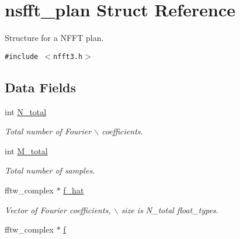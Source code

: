 \hypertarget{structnsfft__plan}{
\section{nsfft\_\-plan Struct Reference}
\label{structnsfft__plan}
}
Structure for a NFFT plan.  


{\tt \#include $<$nfft3.h$>$}

\subsection*{Data Fields}
\begin{CompactItemize}
\item 
\hypertarget{structnsfft__plan_87e0123a3ccf6a42102e065dca2f8505}{
int \hyperlink{structnsfft__plan_87e0123a3ccf6a42102e065dca2f8505}{N\_\-total}}
\label{structnsfft__plan_87e0123a3ccf6a42102e065dca2f8505}

\begin{CompactList}\small\item\em Total number of Fourier $\backslash$ coefficients. \item\end{CompactList}\item 
\hypertarget{structnsfft__plan_03da0fc6abab6b0d2e15053ef1f3109e}{
int \hyperlink{structnsfft__plan_03da0fc6abab6b0d2e15053ef1f3109e}{M\_\-total}}
\label{structnsfft__plan_03da0fc6abab6b0d2e15053ef1f3109e}

\begin{CompactList}\small\item\em Total number of samples. \item\end{CompactList}\item 
\hypertarget{structnsfft__plan_e3e2fcefd21caff3aa1e978b522d4ee3}{
fftw\_\-complex $\ast$ \hyperlink{structnsfft__plan_e3e2fcefd21caff3aa1e978b522d4ee3}{f\_\-hat}}
\label{structnsfft__plan_e3e2fcefd21caff3aa1e978b522d4ee3}

\begin{CompactList}\small\item\em Vector of Fourier coefficients, $\backslash$ size is N\_\-total float\_\-types. \item\end{CompactList}\item 
\hypertarget{structnsfft__plan_7ffefff1410360f4264e12398db06787}{
fftw\_\-complex $\ast$ \hyperlink{structnsfft__plan_7ffefff1410360f4264e12398db06787}{f}}
\label{structnsfft__plan_7ffefff1410360f4264e12398db06787}


\end{CompactItemize}
